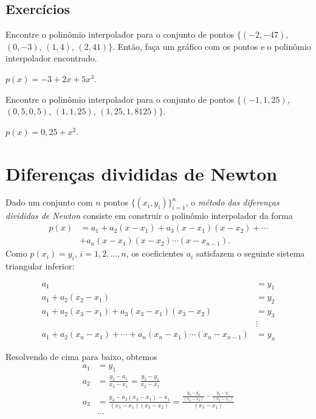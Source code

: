 \subsection*{Exercícios}

\construirExer

\begin{exer}\label{exer:interp1}
Encontre o polinômio interpolador para o conjunto de pontos $\{(-2, -47)$, $(0, -3)$, $(1, 4)$, $(2, 41)\}$. Então, faça um gráfico com os pontos e o polinômio interpolador encontrado.
\end{exer}
\begin{resp}
  $p(x) = -3 + 2x + 5x^3$.
\end{resp}

\begin{exer}
  Encontre o polinômio interpolador para o conjunto de pontos $\{(-1, 1,25)$, $(0,5, 0,5)$, $(1, 1,25)$, $(1,25, 1,8125)\}$.
\end{exer}
\begin{resp}
  $p(x) = 0,25 + x^2$.
\end{resp}

\section{Diferenças divididas de Newton}
Dado um conjunto com $n$ pontos $\{(x_i, y_i)\}_{i=1}^n$, o \emph{método das diferenças divididas de Newton} consiste em construir o polinômio interpolador da forma
\begin{equation}
  \begin{split}
    p(x) &= a_1 + a_2 (x-x_1) + a_3 (x-x_1)(x-x_2) + \cdots \\
         &+ a_n (x-x_1)(x-x_2)\cdots (x-x_{n-1}).
  \end{split}
\end{equation}
Como $p(x_i) = y_i$, $i=1, 2, \dotsc, n$, os coeficientes $a_i$ satisfazem o seguinte sistema triangular inferior:
\begin{small}
  \begin{equation}
    \begin{array}{ll}
a_1               &= y_1\\
a_1+a_2(x_2-x_1)  &= y_2\\
a_1+a_2(x_3-x_1)+a_3(x_3-x_1)(x_3-x_2) &= y_3\\
&\vdots\\
a_1+a_2(x_n-x_1)+\cdots + a_n(x_n-x_1)\cdots (x_n-x_{n-1}) &= y_n
    \end{array}
  \end{equation}
\end{small}
Resolvendo de cima para baixo, obtemos
\begin{equation}\label{eq:coef_dif_div}
  \begin{split}
a_1&=y_1\\
a_2&=\frac{y_2-a_1}{x_2-x_1}=\frac{y_2-y_1}{x_2-x_1}\\
a_3&=\frac{y_3-a_2(x_3-x_1)-a_1}{(x_3-x_1)(x_3-x_2)}=\frac{\frac{y_3-y_2}{(x_3-x_2)}-\frac{y_2-y_1}{(x_2-x_1)}}{(x_3-x_1)}\\
&\ldots
  \end{split}
\end{equation}

